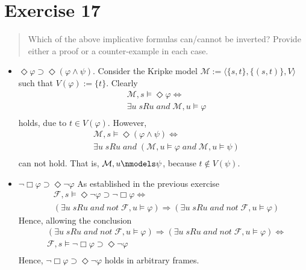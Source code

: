 \documentclass[11pt,a4paper]{article}
\newcommand{\lto}{\supset}
\newcommand{\some}{\Diamond}
\newcommand{\all}{\Box}
\newcommand{\sand}{\; and \;}
\newcommand{\sneg}{not \;}
\newcommand{\sto}{\Rightarrow}
\begin{document}
\section*{Exercise 17}
\begin{quote}
Which of the above implicative formulas can/cannot be inverted? Provide either a proof or a counter-example in each case.
\end{quote}
\begin{itemize}
\item $\some  \varphi \lto \some (\varphi \land \psi)$. Consider the Kripke model $\mathcal{M}:=\langle \{s,t\}, \{(s,t)\}, V \rangle$ such that $V(\varphi):=\{t\}$. Clearly 
\begin{equation*}
\begin{split}
&\mathcal{M},s \models \some  \varphi \iff \\
&\exists u \; sRu \sand \mathcal{M},u \models  \varphi  \\
\end{split}
\end{equation*} 
holds, due to $t \in V(\varphi)$. However,  
\begin{equation*}
\begin{split}
&\mathcal{M},s \models \some  (\varphi \land \psi) \iff \\
&\exists u \; sRu \sand (\mathcal{M},u \models  \varphi \sand \mathcal{M},u \models  \psi ) \\
\end{split}
\end{equation*} 
can not hold. That is, $\mathcal{M},u \nmodels  \psi$, because $t \notin V(\psi)$.



\item $ \neg \all  \varphi \lto  \some \neg \varphi $ As established in the previous exercise 
\begin{equation*}
\begin{split}
&\mathcal{F},s \models \some \neg \varphi \lto  \neg \all  \varphi \iff \\
& (\exists u \; sRu \sand \sneg \mathcal{F},u \models \varphi )\sto (\exists u \;  sRu \sand \sneg \mathcal{F},u \models \varphi)
\end{split}
\end{equation*} 
Hence, allowing the conclusion 
\begin{equation*}
\begin{split}
& (\exists u \; sRu \sand \sneg \mathcal{F},u \models \varphi )\sto (\exists u \;  sRu \sand \sneg \mathcal{F},u \models \varphi) \iff \\
&\mathcal{F},s \models  \neg \all  \varphi \lto \some \neg \varphi\\
\end{split}
\end{equation*} 
Hence, $ \neg \all  \varphi \lto  \some \neg \varphi $ holds in arbitrary frames.



\end{itemize}
\end{document}
